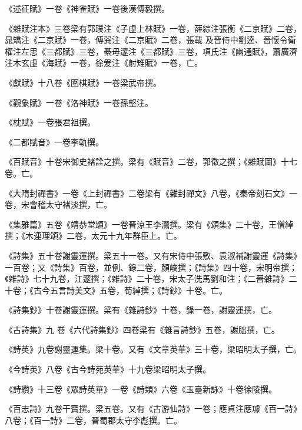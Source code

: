 \begin{pinyinscope}
 《述征賦》一卷《神雀賦》一卷後漢傅毅撰。



 《雜賦注本》三卷梁有郭璞注《子虛上林賦》一卷，薛綜注張衡《二京賦》二卷，晁矯注《二京賦》一卷，傅巽注《二京賦》二卷，張載
 及晉侍中劉逵、晉懷令衛權注左思《三都賦》三卷，綦毋邃注《三都賦》三卷，項氏注《幽通賦》，蕭廣濟注木玄虛《海賦》一卷，徐爰注《射雉賦》一卷，亡。



 《獻賦》十八卷《圍棋賦》一卷梁武帝撰。



 《觀象賦》一卷《洛神賦》一卷孫壑注。



 《枕賦》一卷張君祖撰。



 《二都賦音》一卷李軌撰。



 《百賦音》十卷宋御史褚詮之撰。梁有《賦音》二卷，郭徵之撰；《雜賦圖》十七卷。亡。



 《大隋封禪書》一卷《上封禪書》二卷梁有《雜封禪文》八卷，《秦帝刻石文》一卷，宋會稽太守褚淡撰，亡。



 《集雅篇》五卷《靖恭堂頌》一卷晉涼王李灊撰。梁有《頌集》二十卷，王僧綽撰；《木連理頌》二卷，太元十九年群臣上。亡。



 《詩集》五十卷謝靈運撰。梁五十一卷。又有宋侍中張敷、袁淑補謝靈運《詩集》一百卷；又《詩集》百卷，並例、錄二卷，顏峻撰；《詩集》四十卷，宋明帝撰；《雜詩》七十九卷，江邃撰；《雜詩》二十卷，宋太子洗馬劉和注；《二晉雜詩》二十卷；《古今五言詩美文》五卷，荀綽撰；《詩鈔》十卷。亡。



 《詩集鈔》十卷謝靈運撰。梁有《雜詩鈔》十卷，錄一卷，謝靈運撰，亡。



 《古詩集》九
 卷《六代詩集鈔》四卷梁有《雜言詩鈔》五卷，謝朏撰，亡。



 《詩英》九卷謝靈運集。梁十卷。又有《文章英華》三十卷，梁昭明太子撰，亡。



 《今詩英》八卷《古今詩苑英華》十九卷梁昭明太子撰。



 《詩纘》十三卷《眾詩英華》一卷《詩類》六卷《玉臺新詠》十卷徐陵撰。



 《百志詩》九卷干寶撰。梁五卷。又有《古游仙詩》一卷；應貞注應璩《百一詩》八卷；《百一詩》二卷，晉蜀郡太守李彪撰。亡。




\end{pinyinscope}

